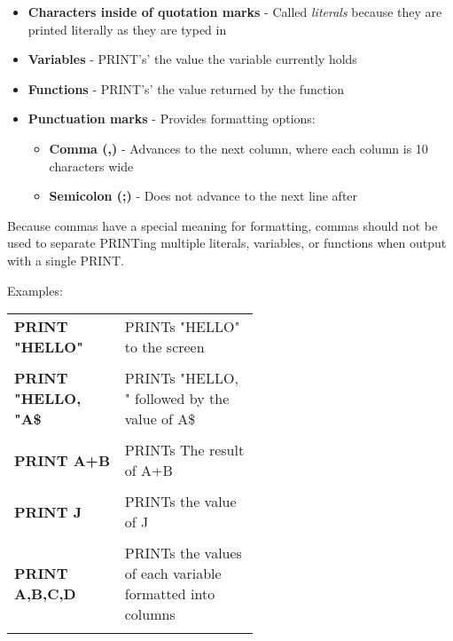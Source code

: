 \begin{itemize}

	\item {\bfseries Characters inside of quotation marks} - Called
		\emph{literals} because they are printed literally as they are typed
		in

	\item {\bfseries Variables} - {\ttfamily PRINT}'s' the value the variable
		currently holds

	\item {\bfseries Functions} - {\ttfamily PRINT}'s' the value returned by
		the function

	\item {\bfseries Punctuation marks} - Provides formatting options:
		\begin{itemize}

			\item {\bfseries Comma ({\ttfamily ,})} - Advances to the next
				column, where each column is 10 characters wide

			\item {\bfseries Semicolon ({\ttfamily ;})} - Does not advance to
				the next line after

		\end{itemize}


\end{itemize}

Because commas have a special meaning for formatting, commas should not be used
to separate {\ttfamily PRINT}ing multiple literals, variables, or functions
when output with a single {\ttfamily PRINT}.

Examples:\\

\begin{tabular}{l p{0.55\linewidth}}

	{\ttfamily\bfseries PRINT "HELLO"} & {\ttfamily PRINT}s "HELLO" to the screen\\\\

	{\ttfamily\bfseries PRINT "HELLO, "A\$} & {\ttfamily PRINT}s "HELLO, "
	followed by the value of {\ttfamily A\$}\\\\

	{\ttfamily\bfseries PRINT A+B} & {\ttfamily PRINT}s The result of {\ttfamily A+B}\\\\

	{\ttfamily\bfseries PRINT J} & {\ttfamily PRINT}s the value of {\ttfamily J}\\\\

	{\ttfamily\bfseries PRINT A,B,C,D} & {\ttfamily PRINT}s the values of each
	variable formatted into columns\\\\

\end{tabular}

